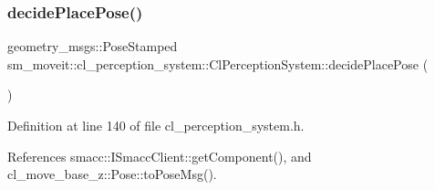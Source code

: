 \subsubsection{\texorpdfstring{decide\+Place\+Pose()}{decidePlacePose()}}
{\footnotesize\ttfamily geometry\+\_\+msgs\+::\+Pose\+Stamped sm\+\_\+moveit\+::cl\+\_\+perception\+\_\+system\+::\+Cl\+Perception\+System\+::decide\+Place\+Pose (\begin{DoxyParamCaption}{ }\end{DoxyParamCaption})\hspace{0.3cm}{\ttfamily [inline]}}



Definition at line 140 of file cl\+\_\+perception\+\_\+system.\+h.



References smacc\+::\+I\+Smacc\+Client\+::get\+Component(), and cl\+\_\+move\+\_\+base\+\_\+z\+::\+Pose\+::to\+Pose\+Msg().


